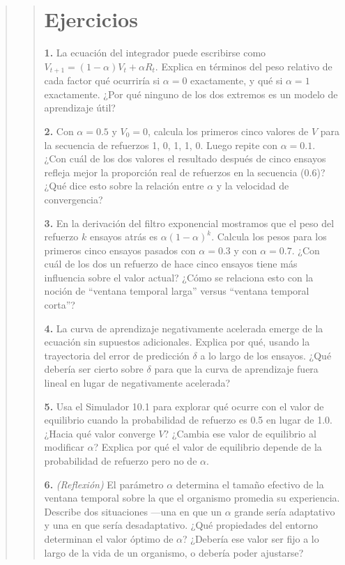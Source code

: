 \documentclass[
  letterpaper,
  DIV=11,
  numbers=noendperiod]{scrreprt}
\begin{document}
\begin{tcolorbox}[enhanced jigsaw, toprule=.15mm, arc=.35mm, colback=white, opacityback=0, colframe=quarto-callout-note-color-frame, breakable, rightrule=.15mm, left=2mm, leftrule=.75mm, bottomrule=.15mm]
\begin{quote}
\begin{quote}
\section{Ejercicios}\label{ejercicios-2}

\textbf{1.} La ecuación del integrador puede escribirse como
\(V_{t+1} = (1-\alpha)V_t + \alpha R_t\). Explica en términos del peso
relativo de cada factor qué ocurriría si \(\alpha = 0\) exactamente, y
qué si \(\alpha = 1\) exactamente. ¿Por qué ninguno de los dos extremos
es un modelo de aprendizaje útil?

\textbf{2.} Con \(\alpha = 0.5\) y \(V_0 = 0\), calcula los primeros
cinco valores de \(V\) para la secuencia de refuerzos 1, 0, 1, 1, 0.
Luego repite con \(\alpha = 0.1\). ¿Con cuál de los dos valores el
resultado después de cinco ensayos refleja mejor la proporción real de
refuerzos en la secuencia (0.6)? ¿Qué dice esto sobre la relación entre
\(\alpha\) y la velocidad de convergencia?

\textbf{3.} En la derivación del filtro exponencial mostramos que el
peso del refuerzo \(k\) ensayos atrás es \(\alpha(1-\alpha)^k\). Calcula
los pesos para los primeros cinco ensayos pasados con \(\alpha = 0.3\) y
con \(\alpha = 0.7\). ¿Con cuál de los dos un refuerzo de hace cinco
ensayos tiene más influencia sobre el valor actual? ¿Cómo se relaciona
esto con la noción de ``ventana temporal larga'' versus ``ventana
temporal corta''?

\textbf{4.} La curva de aprendizaje negativamente acelerada emerge de la
ecuación sin supuestos adicionales. Explica por qué, usando la
trayectoria del error de predicción \(\delta\) a lo largo de los
ensayos. ¿Qué debería ser cierto sobre \(\delta\) para que la curva de
aprendizaje fuera lineal en lugar de negativamente acelerada?

\textbf{5.} Usa el Simulador 10.1 para explorar qué ocurre con el valor
de equilibrio cuando la probabilidad de refuerzo es 0.5 en lugar de 1.0.
¿Hacia qué valor converge \(V\)? ¿Cambia ese valor de equilibrio al
modificar \(\alpha\)? Explica por qué el valor de equilibrio depende de
la probabilidad de refuerzo pero no de \(\alpha\).

\textbf{6.} \emph{(Reflexión)} El parámetro \(\alpha\) determina el
tamaño efectivo de la ventana temporal sobre la que el organismo
promedia su experiencia. Describe dos situaciones ---una en que un
\(\alpha\) grande sería adaptativo y una en que sería desadaptativo.
¿Qué propiedades del entorno determinan el valor óptimo de \(\alpha\)?
¿Debería ese valor ser fijo a lo largo de la vida de un organismo, o
debería poder ajustarse?


\end{quote}
\end{quote}
\end{tcolorbox}
\end{document}
